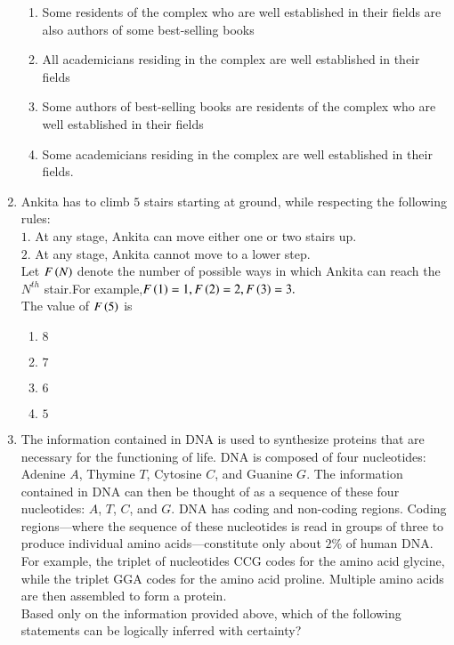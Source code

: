 \documentclass[journal]{IEEEtran}
\begin{document}
\begin{enumerate}
    \begin{enumerate}
        \item Some residents of the complex who are well established in their fields are also authors of some best-selling books
        \item All academicians residing in the complex are well established in their fields
        \item Some authors of best-selling books are residents of the complex who are well established in their fields
        \item Some academicians residing in the complex are well established in their fields.
    \end{enumerate}
    \item Ankita has to climb $5$ stairs starting at ground, while respecting the following rules:\\
    $1.$ At any stage, Ankita can move either one or two stairs up.\\
    $2.$ At any stage, Ankita cannot move to a lower step.\\
    Let $F\left(N\right)$ denote the number of possible ways in which Ankita can reach the $N^{th}$ stair.For example,$F\left(1\right)=1,F\left(2\right)=2,F\left(3\right)=3.$\\
    The value of $F\left(5\right)$ is
    \begin{enumerate}
        \item $8$
        \item $7$
        \item $6$
        \item $5$\\
    \end{enumerate}
   \item The information contained in DNA is used to synthesize proteins that are necessary for the functioning of life. DNA is composed of four nucleotides: Adenine $A$, Thymine $T$, Cytosine $C$, and Guanine $G$. The information contained in DNA can then be thought of as a sequence of these four nucleotides: $A$, $T$, $C$, and $G$. DNA has coding and non-coding regions. Coding regions—where the sequence of these nucleotides is read in groups of three to produce individual amino acids—constitute only about $2\%$ of human DNA. For example, the triplet of nucleotides CCG codes for the amino acid glycine, while the triplet GGA codes for the amino acid proline. Multiple amino acids are then assembled to form a protein.\\
    Based only on the information provided above, which of the following statements can be logically inferred with certainty?\\

\end{enumerate}
\end{document}
